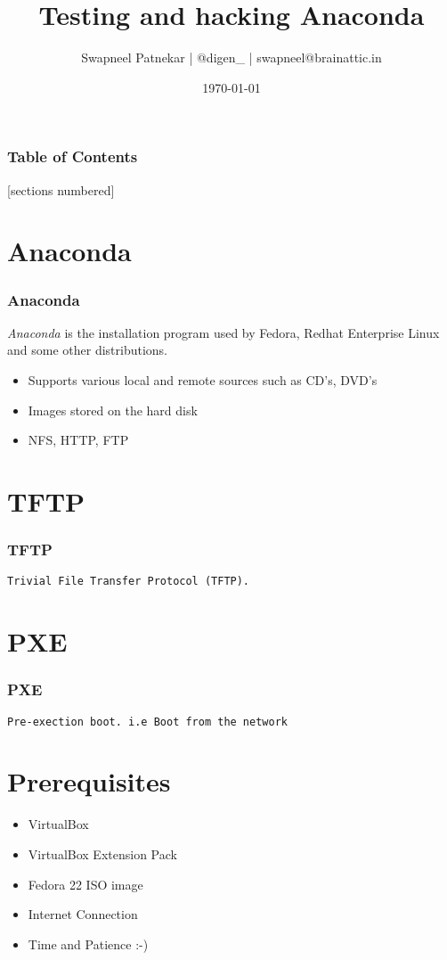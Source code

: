 \documentclass[10pt]{beamer}
\title{Testing and hacking Anaconda}
\subtitle{}
\date{\today}
\author{Swapneel Patnekar | @digen\_ | swapneel@brainattic.in}
\begin{document}
\maketitle


\begin{frame}
  \frametitle{Table of Contents}
  [sections numbered]
  \tableofcontents[hideallsubsections]
\end{frame}

\section{Anaconda}

\begin{frame}[fragile]
  \frametitle{Anaconda}

  \emph{Anaconda} is the installation program used by Fedora, Redhat Enterprise Linux and some other distributions.

  \begin{itemize}
    \item Supports various local and remote sources such as CD's, DVD's 
    \item Images stored on the hard disk
    \item NFS, HTTP, FTP 
  \end{itemize}
\end{frame}


\section{TFTP}
\begin{frame}[fragile]
  \frametitle{TFTP}
      \begin{verbatim}Trivial File Transfer Protocol (TFTP). \end{verbatim}


\end{frame}

\section{PXE}
\begin{frame}[fragile]
  \frametitle{PXE}
      \begin{verbatim}Pre-exection boot. i.e Boot from the network \end{verbatim}
\end{frame}


\section{Prerequisites}
\begin{frame}[fragile]
\begin{itemize}
\item VirtualBox
\item VirtualBox Extension Pack
\item  Fedora 22 ISO image
\item  Internet Connection
\item  Time and Patience :-) 
\end{itemize}
\end{frame}
\end{document}
